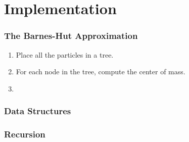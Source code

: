 \section{Implementation}

\begin{frame}
	\frametitle{The Barnes-Hut Approximation}
	\begin{enumerate}
		\item Place all the particles in a tree.
		\item For each node in the tree, compute the center of mass.
		\item 
	\end{enumerate}
\end{frame}

\begin{frame}
	\frametitle{Data Structures}
\end{frame}

\begin{frame}
\frametitle{Recursion}
\end{frame}

